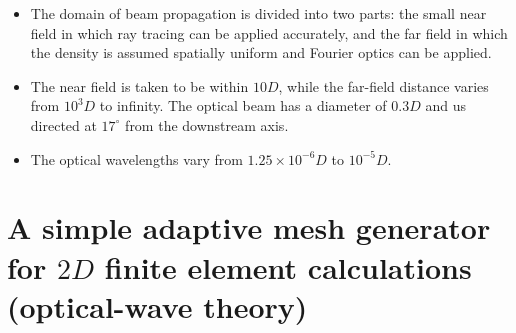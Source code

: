 \begin{itemize}
            \item The domain of beam propagation is divided into two parts: the small near field in which ray tracing can be applied accurately, and the far field in which the density is assumed spatially uniform and Fourier optics can be applied. 
            \item The near field is taken to be within $10D$, while the far-field distance varies from $10^3D$ to infinity. The optical beam has a diameter of $0.3D$ and us directed at $17^{\circ}$ from the downstream axis. 
            \item The optical wavelengths vary from $1.25\times 10^{-6}D$ to $10^{-5}D$. 
        \end{itemize}


    \section{A simple adaptive mesh generator for $2D$ finite element calculations (optical-wave theory) \cite{fernandez:ieee:1993}}
